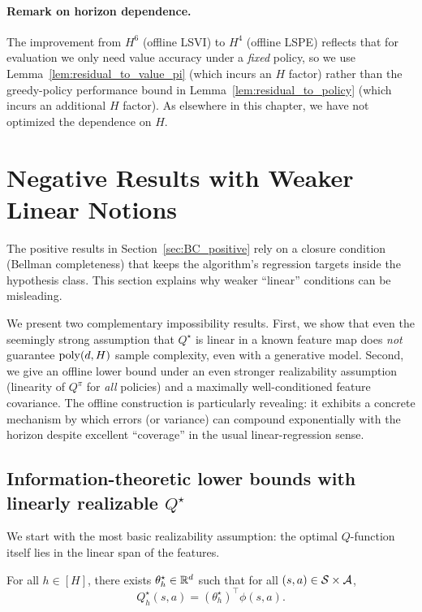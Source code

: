 \paragraph{Remark on horizon dependence.}
The improvement from $H^6$ (offline LSVI) to $H^4$ (offline LSPE) reflects that for
evaluation we only need value accuracy under a \emph{fixed} policy, so we use
Lemma~\ref{lem:residual_to_value_pi} (which incurs an $H$ factor) rather than the
greedy-policy performance bound in Lemma~\ref{lem:residual_to_policy} (which incurs
an additional $H$ factor). As elsewhere in this chapter, we have not optimized the
dependence on $H$.



\section{Negative Results with Weaker Linear Notions}
\label{sec:linear_Qvalues}

The positive results in Section~\ref{sec:BC_positive} rely on a closure condition
(Bellman completeness) that keeps the algorithm's regression targets inside the
hypothesis class.  This section explains why weaker ``linear'' conditions can be
misleading.

We present two complementary impossibility results.
First, we show that even the seemingly strong assumption that $Q^\star$ is linear
in a known feature map does \emph{not} guarantee $\mathrm{poly}(d,H)$ sample complexity,
even with a generative model.
Second, we give an offline lower bound under an even stronger realizability
assumption (linearity of $Q^\pi$ for \emph{all} policies) and a maximally
well-conditioned feature covariance.  The offline construction is particularly
revealing: it exhibits a concrete mechanism by which errors (or variance) can
compound exponentially with the horizon despite excellent ``coverage'' in the
usual linear-regression sense.

\subsection{Information-theoretic lower bounds with linearly realizable $Q^\star$}
\label{subsec:linearQstar}

We start with the most basic realizability assumption: the optimal $Q$-function
itself lies in the linear span of the features.

\begin{assumption}
\label{assumption:realizability_Qstar}
For all $h\in[H]$, there exists $\theta_h^\star\in\mathbb{R}^d$ such that for all
$(s,a)\in\mathcal{S}\times\mathcal{A}$,
\[
Q_h^\star(s,a)= (\theta_h^\star)^\top \phi(s,a).
\]
\end{assumption}

